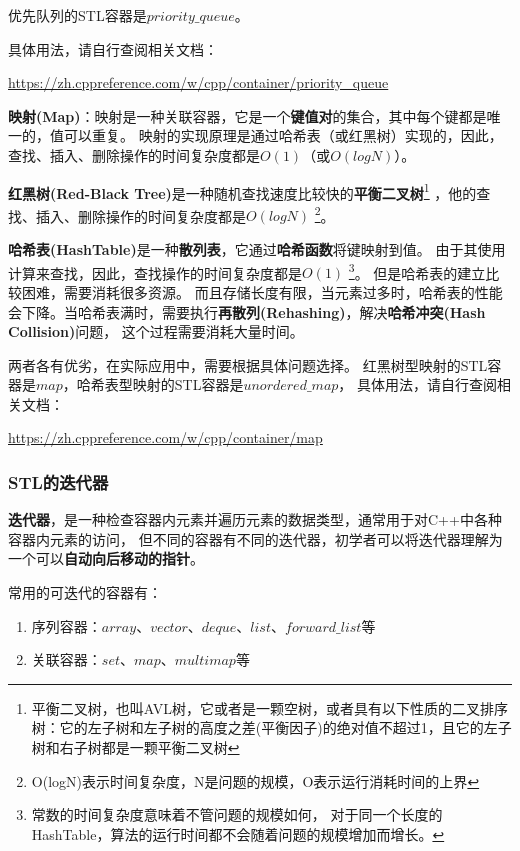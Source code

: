 优先队列的STL容器是$priority\_queue$。

具体用法，请自行查阅相关文档：

\url{https://zh.cppreference.com/w/cpp/container/priority_queue}

\textbf{映射(Map)}：映射是一种关联容器，它是一个\textbf{键值对}的集合，其中每个键都是唯一的，值可以重复。
映射的实现原理是通过哈希表（或红黑树）实现的，因此，查找、插入、删除操作的时间复杂度都是$O(1)$（或$O(logN)$）。

\textbf{红黑树(Red-Black Tree)}是一种随机查找速度比较快的\textbf{平衡二叉树}\footnote{
    平衡二叉树，也叫AVL树，它或者是一颗空树，或者具有以下性质的二叉排序树：它的左子树和左子树的高度之差(平衡因子)的绝对值不超过1，且它的左子树和右子树都是一颗平衡二叉树}
，他的查找、插入、删除操作的时间复杂度都是$O(logN)$ \footnote{
    O(logN)表示时间复杂度，N是问题的规模，O表示运行消耗时间的上界
}。

\textbf{哈希表(HashTable)}是一种\textbf{散列表}，它通过\textbf{哈希函数}将键映射到值。
由于其使用计算来查找，因此，查找操作的时间复杂度都是$O(1)$
\footnote{常数的时间复杂度意味着不管问题的规模如何，
对于同一个长度的HashTable，算法的运行时间都不会随着问题的规模增加而增长。}。
但是哈希表的建立比较困难，需要消耗很多资源。
而且存储长度有限，当元素过多时，哈希表的性能会下降。当哈希表满时，需要执行\textbf{再散列(Rehashing)}，解决\textbf{哈希冲突(Hash Collision)}问题，
这个过程需要消耗大量时间。

两者各有优劣，在实际应用中，需要根据具体问题选择。
红黑树型映射的STL容器是$map$，哈希表型映射的STL容器是$unordered\_map$，
具体用法，请自行查阅相关文档：

\url{https://zh.cppreference.com/w/cpp/container/map}

\subsubsection{STL的迭代器}

\textbf{迭代器}，是一种检查容器内元素并遍历元素的数据类型，通常用于对C++中各种容器内元素的访问，
但不同的容器有不同的迭代器，初学者可以将迭代器理解为一个可以\textbf{自动向后移动的指针}。

常用的可迭代的容器有：

\begin{enumerate}
    \item 序列容器：$array$、$vector$、$deque$、$list$、$forward\_list$等
    \item 关联容器：$set$、$map$、$multimap$等
\end{enumerate}

